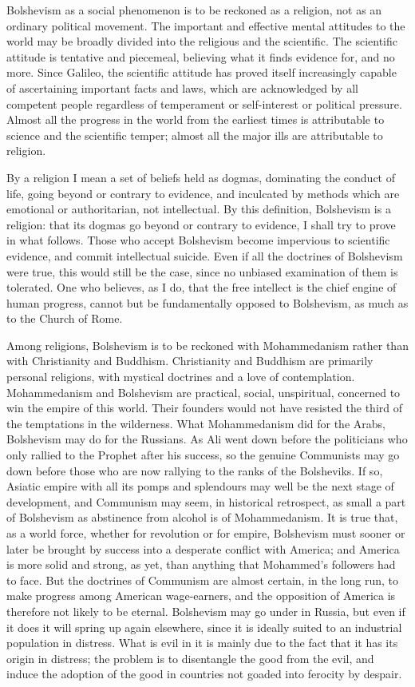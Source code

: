 Bolshevism as a social phenomenon is to be reckoned as a religion, not as an ordinary political movement. The important and effective mental attitudes to the world may be broadly divided into the religious and the scientific. The scientific attitude is tentative and piecemeal, believing what it finds evidence for, and no more. Since Galileo, the scientific attitude has proved itself increasingly capable of ascertaining important facts and laws, which are acknowledged by all competent people regardless of temperament or self-interest or political pressure. Almost all the progress in the world from the earliest times is attributable to science and the scientific temper; almost all the major ills are attributable to religion.

By a religion I mean a set of beliefs held as dogmas, dominating the conduct of life, going beyond or contrary to evidence, and inculcated by methods which are emotional or authoritarian, not intellectual. By this definition, Bolshevism is a religion: that its dogmas go beyond or contrary to evidence, I shall try to prove in what follows. Those who accept Bolshevism become impervious to scientific evidence, and commit intellectual suicide. Even if all the doctrines of Bolshevism were true, this would still be the case, since no unbiased examination of them is tolerated. One who believes, as I do, that the free intellect is the chief engine of human progress, cannot but be fundamentally opposed to Bolshevism, as much as to the Church of Rome.

Among religions, Bolshevism is to be reckoned with Mohammedanism rather than with Christianity and Buddhism. Christianity and Buddhism are primarily personal religions, with mystical doctrines and a love of contemplation. Mohammedanism and Bolshevism are practical, social, unspiritual, concerned to win the empire of this world. Their founders would not have resisted the third of the temptations in the wilderness. What Mohammedanism did for the Arabs, Bolshevism may do for the Russians. As Ali went down before the politicians who only rallied to the Prophet after his success, so the genuine Communists may go down before those who are now rallying to the ranks of the Bolsheviks. If so, Asiatic empire with all its pomps and splendours may well be the next stage of development, and Communism may seem, in historical retrospect, as small a part of Bolshevism as abstinence from alcohol is of Mohammedanism. It is true that, as a world force, whether for revolution or for empire, Bolshevism must sooner or later be brought by success into a desperate conflict with America; and America is more solid and strong, as yet, than anything that Mohammed's followers had to face. But the doctrines of Communism are almost certain, in the long run, to make progress among American wage-earners, and the opposition of America is therefore not likely to be eternal. Bolshevism may go under in Russia, but even if it does it will spring up again elsewhere, since it is ideally suited to an industrial population in distress. What is evil in it is mainly due to the fact that it has its origin in distress; the problem is to disentangle the good from the evil, and induce the adoption of the good in countries not goaded into ferocity by despair.

